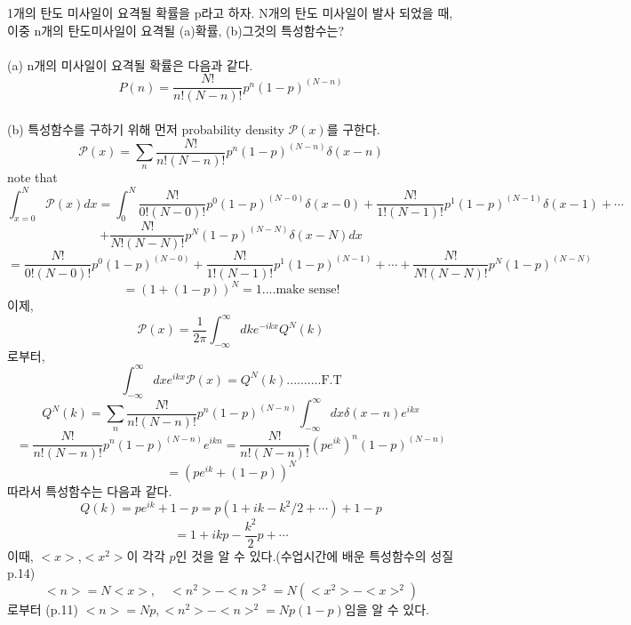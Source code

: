 \documentclass[a4paper,12pt]{article}
\begin{document}
	\begin{flushleft}
	1개의 탄도 미사일이 요격될 확률을 p라고 하자. N개의 탄도 미사일이 발사 되었을 때, 이중 n개의 탄도미사일이 요격될 (a)확률, (b)그것의 특성함수는?  
	\end{flushleft}
\paragraph{}
(a) n개의 미사일이 요격될 확률은 다음과 같다.
$$P(n)=\frac{N!}{n!(N-n)!}p^{n}(1-p)^{(N-n)} $$
\paragraph{}
(b) 특성함수를 구하기 위해 먼저 probability density $\mathcal{P}(x) $를 구한다. 
$$\mathcal{P}(x)=\sum_{n}\frac{N!}{n!(N-n)!}p^{n}(1-p)^{(N-n)}\delta(x-n)$$
note that 
$$\int_{x=0}^{N}\mathcal{P}(x)dx=\int_{0}^{N}\frac{N!}{0!(N-0)!}p^{0}(1-p)^{(N-0)}\delta(x-0)+\frac{N!}{1!(N-1)!}p^{1}(1-p)^{(N-1)}\delta(x-1)+\cdots$$ $$+\frac{N!}{N!(N-N)!}p^{N}(1-p)^{(N-N)}\delta(x-N)dx$$
$$=\frac{N!}{0!(N-0)!}p^{0}(1-p)^{(N-0)}+\frac{N!}{1!(N-1)!}p^{1}(1-p)^{(N-1)}+\cdots+\frac{N!}{N!(N-N)!}p^{N}(1-p)^{(N-N)}$$
$$=(1+(1-p))^{N}=1....\mbox{make sense!}$$이제,
$$\mathcal{P}(x)=\frac{1}{2\pi}\int_{-\infty}^{\infty}dk e^{-ikx}Q^{N}(k)$$로부터,
$$\int_{-\infty}^{\infty}dx e^{ikx}\mathcal{P}(x)=Q^{N}(k)..........\mbox{F.T}$$
$$Q^{N}(k)=\sum_{n}\frac{N!}{n!(N-n)!}p^{n}(1-p)^{(N-n)}\int_{-\infty}^{\infty}dx\delta(x-n)e^{ikx}$$
$$=\frac{N!}{n!(N-n)!}p^{n}(1-p)^{(N-n)}e^{ikn}=\frac{N!}{n!(N-n)!}(pe^{ik})^{n}(1-p)^{(N-n)}$$
$$=(pe^{ik}+(1-p))^{N}$$
따라서 특성함수는 다음과 같다.
$$Q(k)=pe^{ik}+1-p=p(1+ik-k^2/2+\cdots)+1-p$$
$$=1+ikp-\frac{k^2}{2}p+\cdots$$이때, $<x>$,$<x^2>$이 각각 $p$인 것을 알 수 있다.(수업시간에 배운 특성함수의 성질 p.14)$$<n>=N<x>,\quad <n^2>-<n>^2=N(<x^2>-<x>^2)$$
로부터 (p.11)
$<n>=Np, <n^2>-<n>^2=Np(1-p)$임을 알 수 있다.
\end{document}
